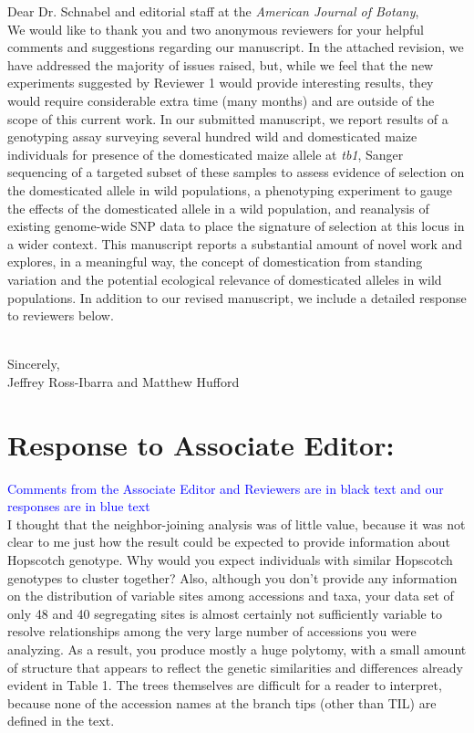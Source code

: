 \documentclass[11pt]{article}
\newcommand{\res}[1]{\noindent \textcolor{blue}{{#1}} \\}
\begin{document}
\noindent Dear Dr. Schnabel and editorial staff at the \emph{American Journal of Botany}, \\

We would like to thank you and two anonymous reviewers for your helpful comments and suggestions regarding our manuscript.  In the attached revision, we have addressed the majority of issues raised, but, while we feel that the new experiments suggested by Reviewer 1 would provide interesting results, they would require considerable extra time (many months) and are outside of the scope of this current work.  In our submitted manuscript, we report results of a genotyping assay surveying several hundred wild and domesticated maize individuals for presence of the domesticated maize allele at \emph{tb1}, Sanger sequencing of a targeted subset of these samples to assess evidence of selection on the domesticated allele in wild populations, a phenotyping experiment to gauge the effects of the domesticated allele in a wild population, and reanalysis of existing genome-wide SNP data to place the signature of selection at this locus in a wider context.  This manuscript reports a substantial amount of novel work and explores, in a meaningful way, the concept of domestication from standing variation and the potential ecological relevance of domesticated alleles in wild populations. In addition to our revised manuscript, we include a detailed response to reviewers below.\\\

\noindent Sincerely,\\

\noindent Jeffrey Ross-Ibarra and Matthew Hufford

\section*{Response to Associate Editor:}

\res{Comments from the Associate Editor and Reviewers are in black text and our responses are in blue text}

I thought that the neighbor-joining analysis was of little value, because it was not clear to me just how the result could be expected to provide information about Hopscotch genotype.  Why would you expect individuals with similar Hopscotch genotypes to cluster together?  Also, although you don't provide any information on the distribution of variable sites among accessions and taxa, your data set of only 48 and 40 segregating sites is almost certainly not sufficiently variable to resolve relationships among the very large number of accessions you were analyzing.  As a result, you produce mostly a huge polytomy, with a small amount of structure that appears to reflect the genetic similarities and differences already evident in Table 1.  The trees themselves are difficult for a reader to interpret, because none of the accession names at the branch tips (other than TIL) are defined in the text.\\
\end{document}
